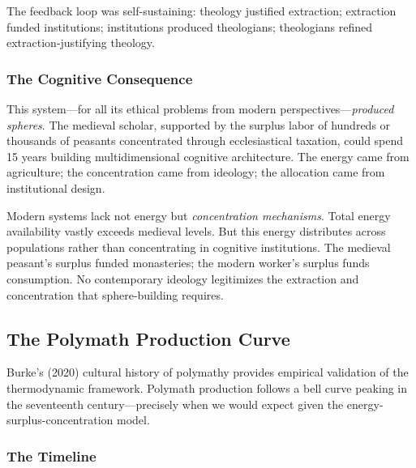 The feedback loop was self-sustaining: theology justified extraction; extraction funded institutions; institutions produced theologians; theologians refined extraction-justifying theology.

\subsubsection{The Cognitive Consequence}

This system---for all its ethical problems from modern perspectives---\textit{produced spheres}. The medieval scholar, supported by the surplus labor of hundreds or thousands of peasants concentrated through ecclesiastical taxation, could spend 15 years building multidimensional cognitive architecture. The energy came from agriculture; the concentration came from ideology; the allocation came from institutional design.

Modern systems lack not energy but \textit{concentration mechanisms}. Total energy availability vastly exceeds medieval levels. But this energy distributes across populations rather than concentrating in cognitive institutions. The medieval peasant's surplus funded monasteries; the modern worker's surplus funds consumption. No contemporary ideology legitimizes the extraction and concentration that sphere-building requires.

\subsection{The Polymath Production Curve}

Burke's (2020) cultural history of polymathy provides empirical validation of the thermodynamic framework. Polymath production follows a bell curve peaking in the seventeenth century---precisely when we would expect given the energy-surplus-concentration model.

\subsubsection{The Timeline}

